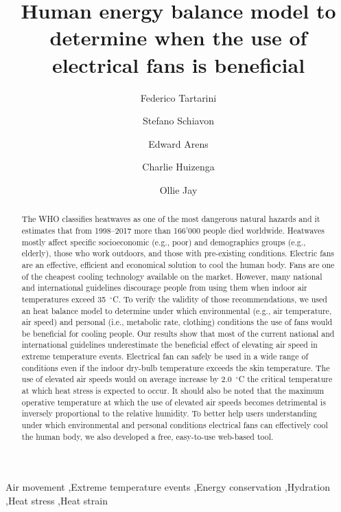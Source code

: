 
\begin{frontmatter}

\title{Human energy balance model to determine when the use of electrical fans is beneficial}

\author[sinBerBest]{Federico Tartarini}
\author[CBE]{Stefano Schiavon}
\author[CBE]{Edward Arens}
\author[CBE]{Charlie Huizenga}
\author[USYD]{Ollie Jay}


\address[sinBerBest]{SinBerBEST, Berkeley Education Alliance for Research in Singapore, Singapore}
\address[CBE]{Center for the Built Environment, University of California, Berkeley, USA}
\address[USYD]{Sydney School ofHealth Sciences, Faculty ofMedicine and Health, The University ofSydney, Sydney, Australia}

\begin{abstract}
    The WHO classifies heatwaves as one of the most dangerous natural hazards and it estimates that from 1998--2017 more than 166'000 people died worldwide.
    Heatwaves mostly affect specific socioeconomic (e.g., poor) and demographics groups (e.g., elderly), those who work outdoors, and those with pre-existing conditions.
    Electric fans are an effective, efficient and economical solution to cool the human body.
    Fans are one of the cheapest cooling technology available on the market.
    However, many national and international guidelines discourage people from using them when indoor air temperatures exceed 35~$^{\circ}$C\@.
    To verify the validity of those recommendations, we used an heat balance model to determine under which environmental (e.g., air temperature, air speed) and personal (i.e., metabolic rate, clothing) conditions the use of fans would be beneficial for cooling people.
    Our results show that most of the current national and international guidelines underestimate the beneficial effect of elevating air speed in extreme temperature events.
    Electrical fan can safely be used in a wide range of conditions even if the indoor dry-bulb temperature exceeds the skin temperature.
    The use of elevated air speeds would on average increase by 2.0~$^{\circ}$C the critical temperature at which heat stress is expected to occur.
    It should also be noted that the maximum operative temperature at which the use of elevated air speeds becomes detrimental is inversely proportional to the relative humidity.
    To better help users understanding under which environmental and personal conditions electrical fans can effectively cool the human body, we also developed a free, easy-to-use web-based tool.
\end{abstract}

\begin{keyword}
Air movement \sep Extreme temperature events \sep Energy conservation \sep Hydration \sep Heat stress \sep Heat strain
\end{keyword}

\end{frontmatter}
